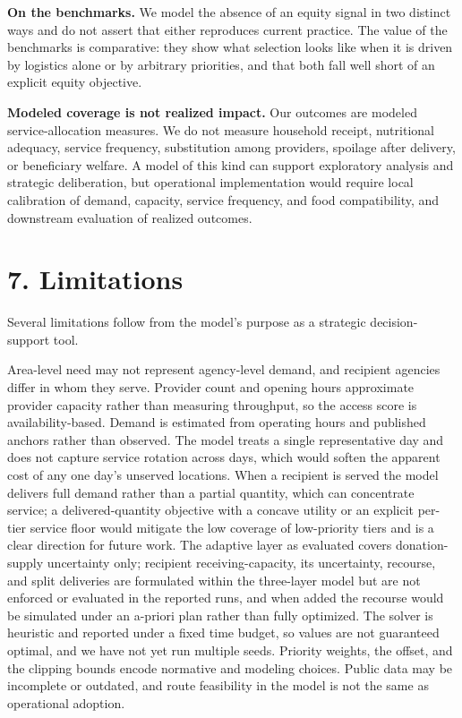 \documentclass[
  11pt,
]{article}
\begin{document}
\textbf{On the benchmarks.} We model the absence of an equity signal in
two distinct ways and do not assert that either reproduces current
practice. The value of the benchmarks is comparative: they show what
selection looks like when it is driven by logistics alone or by
arbitrary priorities, and that both fall well short of an explicit
equity objective.

\textbf{Modeled coverage is not realized impact.} Our outcomes are
modeled service-allocation measures. We do not measure household
receipt, nutritional adequacy, service frequency, substitution among
providers, spoilage after delivery, or beneficiary welfare. A model of
this kind can support exploratory analysis and strategic deliberation,
but operational implementation would require local calibration of
demand, capacity, service frequency, and food compatibility, and
downstream evaluation of realized outcomes.

\section{7. Limitations}\label{limitations}

Several limitations follow from the model's purpose as a strategic
decision-support tool.

Area-level need may not represent agency-level demand, and recipient
agencies differ in whom they serve. Provider count and opening hours
approximate provider capacity rather than measuring throughput, so the
access score is availability-based. Demand is estimated from operating
hours and published anchors rather than observed. The model treats a
single representative day and does not capture service rotation across
days, which would soften the apparent cost of any one day's unserved
locations. When a recipient is served the model delivers full demand
rather than a partial quantity, which can concentrate service; a
delivered-quantity objective with a concave utility or an explicit
per-tier service floor would mitigate the low coverage of low-priority
tiers and is a clear direction for future work. The adaptive layer as
evaluated covers donation-supply uncertainty only; recipient
receiving-capacity, its uncertainty, recourse, and split deliveries are
formulated within the three-layer model but are not enforced or
evaluated in the reported runs, and when added the recourse would be
simulated under an a-priori plan rather than fully optimized. The solver
is heuristic and reported under a fixed time budget, so values are not
guaranteed optimal, and we have not yet run multiple seeds. Priority
weights, the offset, and the clipping bounds encode normative and
modeling choices. Public data may be incomplete or outdated, and route
feasibility in the model is not the same as operational adoption.
\end{document}
